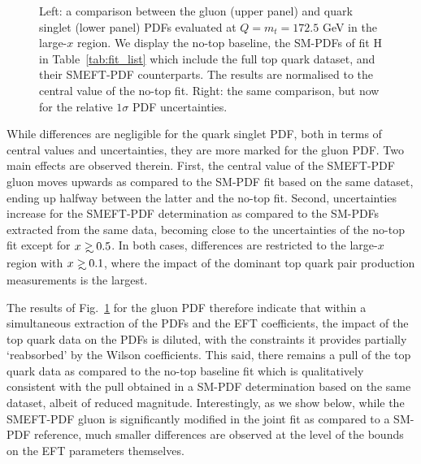 \documentclass[withindex,glossary]{cam-thesis}
\def\gsim{\mathrel{\rlap{\lower4pt\hbox{\hskip1pt$\sim$}}
    \raise1pt\hbox{$>$}}}
\begin{document}
\begin{figure}[H]
{ }
        \caption{
    Left: a comparison between the gluon (upper panel)
    and quark singlet (lower panel) PDFs evaluated at $Q=m_t=172.5$ GeV
    in the large-$x$ region.
    We display the no-top baseline, the SM-PDFs of
    fit H in Table~\ref{tab:fit_list} which include
    the full top quark dataset, and their SMEFT-PDF counterparts.
    The results are normalised to the central value of the no-top fit.
    Right: the same comparison, but now for the relative $1\sigma$ PDF uncertainties.
}
\label{fig:SMEFTpdf_gluon}
\end{figure}

While differences are negligible for the quark singlet PDF, both in terms of
central values and uncertainties, they are more marked for the gluon
PDF. Two main effects are observed therein.
%
First, the central value of the SMEFT-PDF gluon moves upwards as compared
to the SM-PDF fit based on the same dataset, ending up halfway between the latter
and the no-top fit.
%
Second, uncertainties increase for the SMEFT-PDF determination as compared
to the SM-PDFs extracted from the same data, becoming close to the uncertainties
of the no-top fit except for $x\gsim 0.5$.
%
In both cases, differences are restricted to the large-$x$ region with $x\gsim 0.1$,
where the impact of the dominant top quark pair production measurements is
the largest.

The results of Fig.~\ref{fig:SMEFTpdf_gluon} for the gluon PDF therefore indicate that
within a simultaneous extraction of the PDFs and the EFT coefficients, the impact
of the top quark data on the PDFs is diluted, with the constraints it provides 
partially `reabsorbed' by the Wilson coefficients.
%
This said, there remains a pull of the top quark data as compared to
the no-top baseline fit
which is qualitatively consistent with the pull
obtained in a SM-PDF determination based on the same dataset, albeit of reduced magnitude.
%
Interestingly, as we show below, while the SMEFT-PDF gluon is significantly
modified in the joint fit as compared to a SM-PDF reference, much smaller
differences are observed at the level of the bounds on the EFT parameters themselves.
\end{document}
